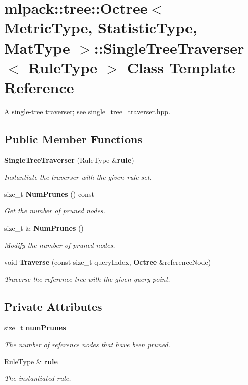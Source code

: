 \section{mlpack\+:\+:tree\+:\+:Octree$<$ Metric\+Type, Statistic\+Type, Mat\+Type $>$\+:\+:Single\+Tree\+Traverser$<$ Rule\+Type $>$ Class Template Reference}
\label{classmlpack_1_1tree_1_1Octree_1_1SingleTreeTraverser}


A single-\/tree traverser; see single\+\_\+tree\+\_\+traverser.\+hpp.  


\subsection*{Public Member Functions}
\begin{DoxyCompactItemize}
\item 
{\bf Single\+Tree\+Traverser} (Rule\+Type \&{\bf rule})
\begin{DoxyCompactList}\small\item\em Instantiate the traverser with the given rule set. \end{DoxyCompactList}\item 
size\+\_\+t {\bf Num\+Prunes} () const 
\begin{DoxyCompactList}\small\item\em Get the number of pruned nodes. \end{DoxyCompactList}\item 
size\+\_\+t \& {\bf Num\+Prunes} ()
\begin{DoxyCompactList}\small\item\em Modify the number of pruned nodes. \end{DoxyCompactList}\item 
void {\bf Traverse} (const size\+\_\+t query\+Index, {\bf Octree} \&reference\+Node)
\begin{DoxyCompactList}\small\item\em Traverse the reference tree with the given query point. \end{DoxyCompactList}\end{DoxyCompactItemize}
\subsection*{Private Attributes}
\begin{DoxyCompactItemize}
\item 
size\+\_\+t {\bf num\+Prunes}
\begin{DoxyCompactList}\small\item\em The number of reference nodes that have been pruned. \end{DoxyCompactList}\item 
Rule\+Type \& {\bf rule}
\begin{DoxyCompactList}\small\item\em The instantiated rule. \end{DoxyCompactList}\end{DoxyCompactItemize}


